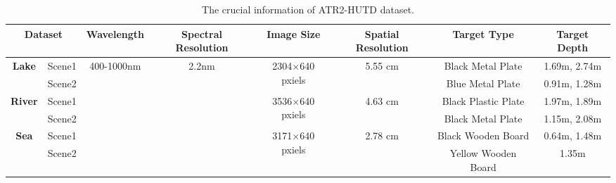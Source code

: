 \begin{table*}[!t]     
    \centering 
    \footnotesize   
    \renewcommand\arraystretch{1.75}     
    \caption{The crucial information of ATR2-HUTD dataset.}     
    \setlength{\tabcolsep}{2.55mm}    
    {     
        \scalebox{1}
        {
        \begin{tabular}{|cc|c|c|c|c|c|c|}
            \hline
            \multicolumn{2}{|c|}{\textbf{Dataset}}                         & \textbf{Wavelength}         & \textbf{Spectral   Resolution} & \textbf{Image Size}              & \textbf{Spatial   Resolution} & \textbf{Target Type} & \textbf{Target Depth} \\ \hline\hline
            \multicolumn{1}{|c|}{\multirow{2}{*}{\textbf{Lake}}}  & Scene1 & \multirow{6}{*}{400-1000nm} & \multirow{6}{*}{2.2nm}              & \multirow{2}{*}{2304$\times$640 pxiels} & \multirow{2}{*}{5.55   cm}    & Black Metal Plate    & 1.69m, 2.74m          \\ \cline{2-2} \cline{7-8} 
            \multicolumn{1}{|c|}{}                                & Scene2 &                             &                                     &                                  &                               & Blue Metal Plate   & 0.91m, 1.28m          \\ \cline{1-2} \cline{5-8} 
            \multicolumn{1}{|c|}{\multirow{2}{*}{\textbf{River}}} & Scene1 &                             &                                     & \multirow{2}{*}{3536$\times$640 pxiels} & \multirow{2}{*}{4.63 cm}      & Black Plastic Plate  & 1.97m, 1.89m           \\ \cline{2-2} \cline{7-8} 
            \multicolumn{1}{|c|}{}                                & Scene2 &                             &                                     &                                  &                               & Black Metal Plate    & 1.15m, 2.08m                 \\ \cline{1-2} \cline{5-8} 
            \multicolumn{1}{|c|}{\multirow{2}{*}{\textbf{Sea}}}   & Scene1 &                             &                                     & \multirow{2}{*}{3171$\times$640 pxiels} & \multirow{2}{*}{2.78 cm}      & Black Wooden Board   & 0.64m, 1.48m          \\ \cline{2-2} \cline{7-8} 
            \multicolumn{1}{|c|}{}                                & Scene2 &                             &                                     &                                  &                               & Yellow Wooden Board  & 1.35m                 \\ \hline
            \end{tabular} }   
    }
    \label{table:B2}
\end{table*}
